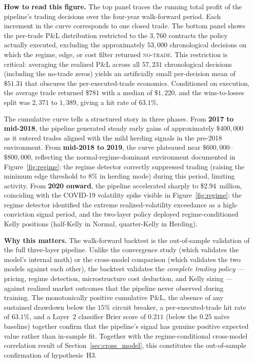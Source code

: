 \documentclass[12pt, letterpaper]{article}
\begin{document}
\textbf{How to read this figure.} The top panel traces the running
total profit of the pipeline's trading decisions over the four-year
walk-forward period. Each increment in the curve corresponds to one
closed trade. The bottom panel shows the per-trade P\&L distribution
restricted to the $3{,}760$ contracts the policy actually executed,
excluding the approximately $53{,}000$ chronological decisions on
which the regime, edge, or cost filter returned \textsc{no-trade}.
This restriction is critical: averaging the realized P\&L across
all $57{,}231$ chronological decisions (including the no-trade
zeros) yields an artificially small per-decision mean of $\$51.31$
that obscures the per-executed-trade economics. Conditioned on
execution, the average trade returned $\$781$ with a median of
$\$1{,}220$, and the wins-to-losses split was $2{,}371$ to $1{,}389$,
giving a hit rate of $63.1\%$.

\newpage
The cumulative curve tells a structured story in three phases. From
\textbf{2017 to mid-2018}, the pipeline generated steady early
gains of approximately $\$400{,}000$ as it entered trades aligned
with the mild herding signals in the pre-2018 environment. From
\textbf{mid-2018 to 2019}, the curve plateaued near
$\$600{,}000$--$\$800{,}000$, reflecting the normal-regime-dominant
environment documented in Figure~\ref{fig:regime}: the regime
detector correctly suppressed trading (raising the minimum edge
threshold to $8\%$ in herding mode) during this period, limiting
activity. From \textbf{2020 onward}, the pipeline accelerated
sharply to \$2.94~million, coinciding with the COVID-19 volatility
spike visible in Figure~\ref{fig:regime}: the regime detector
identified the extreme realized-volatility exceedance as a
high-conviction signal period, and the two-layer policy deployed
regime-conditioned Kelly positions (half-Kelly in Normal,
quarter-Kelly in Herding).

\textbf{Why this matters.} The walk-forward backtest is the
out-of-sample validation of the full three-layer pipeline. Unlike
the convergence study (which validates the model's internal math)
or the cross-model comparison (which validates the two models
against each other), the backtest validates the \textit{complete
trading policy} --- pricing, regime detection, microstructure cost
deduction, and Kelly sizing --- against realized market outcomes
that the pipeline never observed during training. The monotonically
positive cumulative P\&L, the absence of any sustained drawdown
below the $15\%$ circuit breaker, a per-executed-trade hit rate of
$63.1\%$, and a Layer~2 classifier Brier score of $0.211$ (below
the $0.25$ naïve baseline) together confirm that the pipeline's
signal has genuine positive expected value rather than in-sample
fit. Together with the regime-conditional cross-model correlation
result of Section~\ref{sec:cross_model}, this constitutes the
out-of-sample confirmation of hypothesis~H3.
\end{document}
